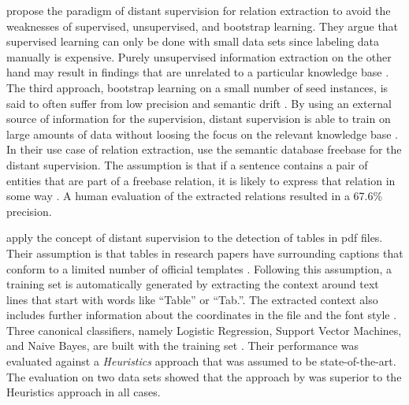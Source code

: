\bigskip

\citet{mintz2009distant} propose the paradigm of \gls{distant supervision} for relation extraction to avoid the weaknesses of supervised, unsupervised, and bootstrap learning.
They argue that supervised learning can only be done with small data sets since labeling data manually is expensive.
Purely unsupervised information extraction on the other hand may result in findings that are unrelated to a particular knowledge base \citep{mintz2009distant}.
The third approach, bootstrap learning on a small number of seed instances, is said to often suffer from low precision and semantic drift \citep{mintz2009distant}.
By using an external source of information for the supervision, \gls{distant supervision} is able to train on large amounts of data without loosing the focus on the relevant knowledge base \citep{mintz2009distant}.
In their use case of relation extraction, \citet{mintz2009distant} use the semantic database \gls{freebase} \citep{bollacker2008freebase} for the \gls{distant supervision}.
The assumption is that if a sentence contains a pair of entities that are part of a \gls{freebase} relation, it is likely to express that relation in some way \citep{mintz2009distant}.
A human evaluation of the extracted relations resulted in a 67.6\% precision.

\citet{fan2015detecting} apply the concept of \gls{distant supervision} to the detection of tables in \gls{pdf} files.
Their assumption is that tables in research papers have surrounding captions that conform to a limited number of official templates \citep{fan2015detecting}.
Following this assumption, a training set is automatically generated by extracting the context around text lines that start with words like ``Table'' or ``Tab.''.
The extracted context also includes further information about the coordinates in the file and the font style \citep{fan2015detecting}.
Three canonical classifiers, namely Logistic Regression, Support Vector Machines, and Naive Bayes, are built with the training set \citep{fan2015detecting}.
Their performance was evaluated against a \emph{Heuristics} approach \citep{klampfl2014comparison} that was assumed to be state-of-the-art.
The evaluation on two data sets showed that the approach by \citet{fan2015detecting} was superior to the Heuristics approach in all cases.


\bigskip

